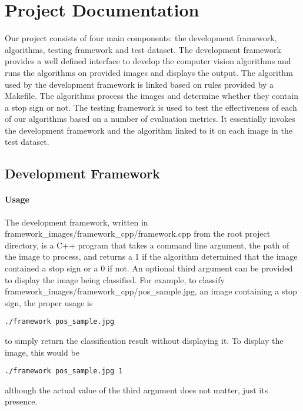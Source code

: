 \documentclass[letterpaper,10pt,titlepage]{article}
\begin{document}
\section*{Project Documentation}
Our project consists of four main components: the development framework, 
algorithms, testing framework and test dataset. The development framework
provides a well defined interface to develop the computer vision algorithms and
runs the algorithms on provided images and displays the output. The algorithm 
used by the development framework is linked based on rules provided by a 
Makefile. The algorithms process the images and determine whether they contain
a stop sign or not. The testing framework is used to test the effectiveness of
each of our algorithms based on a number of evaluation metrics. It essentially
invokes the development framework and the algorithm linked to it on each image
in the test dataset.


\subsection*{Development Framework}
\paragraph*{Usage}
The development framework, written in
framework\_images/framework\_cpp/framework.cpp from the root project directory,
is a C++ program that takes a command line argument, the path of the image to
process, and returns a 1 if the algorithm determined that the image contained a
stop sign or a 0 if not. An optional third argument can be provided to display
the image being classified. For example, to classify 
framework\_images/framework\_cpp/pos\_sample.jpg, an image containing a stop
sign, the proper usage is
\begin{lstlisting}
./framework pos_sample.jpg
\end{lstlisting}
to simply return the classification result without displaying it. To display
the image, this would be
\begin{lstlisting}
./framework pos_sample.jpg 1
\end{lstlisting}
although the actual value of the third argument does not matter, just its 
presence.
\end{document}
